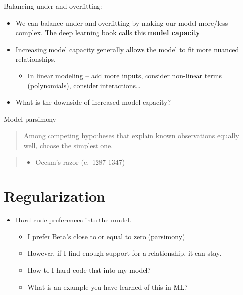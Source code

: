 \documentclass[fontset=fandol,zihao=false,scheme=chinese,heading=true,UTF8]{ctexbook}
\providecommand{\tightlist}{%
  \setlength{\itemsep}{0pt}\setlength{\parskip}{0pt}}
\begin{document}
Balancing under and overfitting:

\begin{itemize}
\tightlist
\item
  We can balance under and overfitting by making our model more/less complex. The deep learning book calls this \textbf{model capacity}
\item
  Increasing model capacity generally allows the model to fit more nuanced relationships.

  \begin{itemize}
  \tightlist
  \item
    In linear modeling -- add more inputs, consider non-linear terms (polynomials), consider interactions\ldots{}
  \end{itemize}
\item
  What is the downside of increased model capacity?
\end{itemize}

Model parsimony

\begin{quote}
Among competing hypotheses that explain known observations equally well, choose the simplest one.
\end{quote}

\begin{quote}
\begin{itemize}
\tightlist
\item
  Occam's razor (c.~1287-1347)
\end{itemize}
\end{quote}

\hypertarget{regularization}{%
\section{Regularization}\label{regularization}}

\begin{itemize}
\tightlist
\item
  Hard code preferences into the model.

  \begin{itemize}
  \tightlist
  \item
    I prefer Beta's close to or equal to zero (parsimony)
  \item
    However, if I find enough support for a relationship, it can stay.
  \item
    How to I hard code that into my model?
  \item
    What is an example you have learned of this in ML?
  \end{itemize}
\end{itemize}
\end{document}
